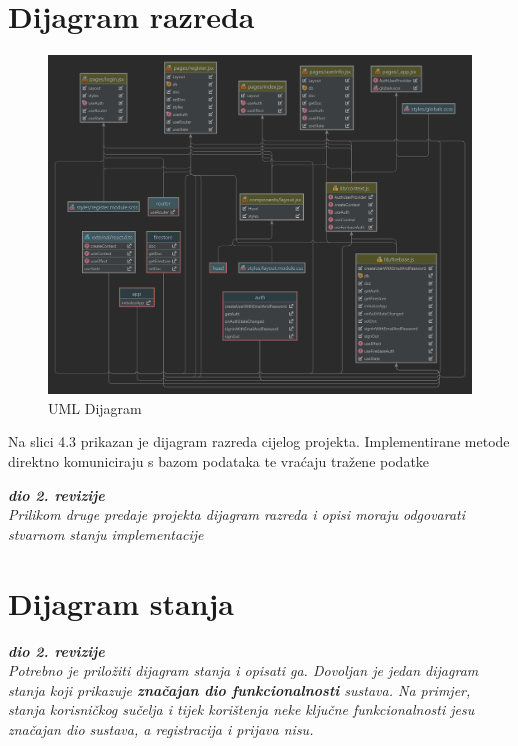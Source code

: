 			\eject
			
		\section{Dijagram razreda}
		
			
			\begin{figure}[H]
			\includegraphics[scale=0.2]{slike/UMLDijagram.png}
			\centering
			\caption{UML Dijagram}
			\label{fig:promjene}
		          \end{figure}
			
			Na slici 4.3 prikazan je dijagram razreda cijelog projekta. Implementirane metode direktno komuniciraju s bazom podataka te vraćaju tražene podatke
			
	
			
			\textbf{\textit{dio 2. revizije}}\\			
			
			\textit{Prilikom druge predaje projekta dijagram razreda i opisi moraju odgovarati stvarnom stanju implementacije}
			
			
			
			\eject
		
		\section{Dijagram stanja}
			
			
			\textbf{\textit{dio 2. revizije}}\\
			
			\textit{Potrebno je priložiti dijagram stanja i opisati ga. Dovoljan je jedan dijagram stanja koji prikazuje \textbf{značajan dio funkcionalnosti} sustava. Na primjer, stanja korisničkog sučelja i tijek korištenja neke ključne funkcionalnosti jesu značajan dio sustava, a registracija i prijava nisu. }
			
